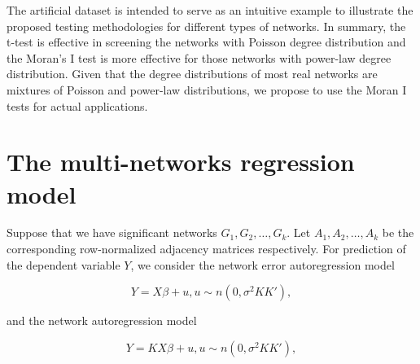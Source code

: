 \documentclass[times, doublespace]{auth}
\begin{document}
The artificial dataset is intended to serve as an intuitive example to illustrate the proposed testing methodologies for different types of networks. In summary, the t-test is effective in screening the networks with Poisson degree distribution and the Moran's I test is more effective for those networks with power-law degree distribution. Given that the degree distributions of most real networks are mixtures of Poisson and power-law distributions, we propose to use the Moran I tests for actual applications.
\newpage
\section{The multi-networks regression model}
Suppose that we have significant networks $G_{1}, G_{2}, \ldots, G_{k}$. Let $A_{1}, A_{2}, \ldots, A_{k}$ be the corresponding row-normalized adjacency matrices respectively. For prediction of the dependent variable $Y$, we consider the network error autoregression model

\begin{equation}
\label{eqn: 7}
Y = X\beta + u,      u \sim n(0, \sigma^{2}KK'),
\end{equation}

and the network autoregression model

\begin{equation}
\label{eqn: 7a}
Y = KX\beta + u,      u \sim n(0, \sigma^{2}KK'),
\end{equation}
\end{document}

